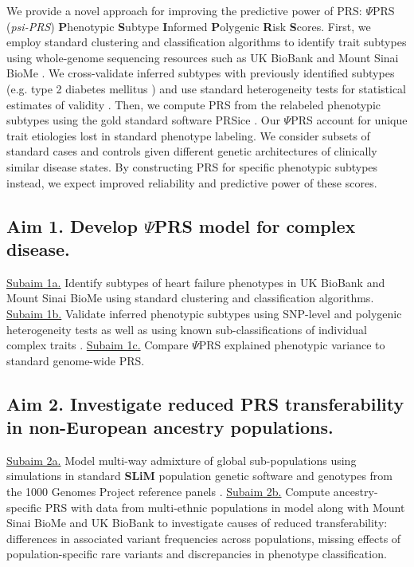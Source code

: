\documentclass[11pt]{article}  %
\newcommand{\inden}[1]{\mbox{} \hspace{#1} } %
\begin{document}
We provide a novel approach for improving the predictive power of PRS: $\Psi$PRS (\textit{psi-PRS}) \textbf{P}henotypic \textbf{S}ubtype \textbf{I}nformed \textbf{P}olygenic \textbf{R}isk \textbf{S}cores. First, we employ standard clustering and classification algorithms to identify trait subtypes using whole-genome sequencing resources such as UK BioBank and Mount Sinai BioMe \cite{bycroft_uk_2018}. We cross-validate inferred subtypes with previously identified subtypes (e.g. type 2 diabetes mellitus \cite{li_identification_2015}) and use standard heterogeneity tests for statistical estimates of validity \cite{dahl_robust_2020}. Then, we compute PRS from the relabeled phenotypic subtypes using the gold standard software PRSice \cite{choi_prsice-2_2019}. Our $\Psi$PRS account for unique trait etiologies lost in standard phenotype labeling. We consider subsets of standard cases and controls given different genetic architectures of clinically similar disease states. By constructing PRS for specific phenotypic subtypes instead, we expect improved reliability and predictive power of these scores.

\subsection*{Aim 1. Develop $\Psi$PRS model for complex disease.}
\underline{Subaim 1a.} Identify subtypes of heart failure phenotypes in UK BioBank and Mount Sinai BioMe using standard clustering and classification algorithms. \underline{Subaim 1b.} Validate inferred phenotypic subtypes using SNP-level \cite{dahl_reverse_2019} and polygenic heterogeneity tests \cite{dahl_robust_2020} as well as using known sub-classifications of individual complex traits \cite{li_identification_2015}. \underline{Subaim 1c.} Compare $\Psi$PRS explained phenotypic variance to standard genome-wide PRS.

\subsection*{Aim 2. Investigate reduced PRS transferability in non-European ancestry populations.}
\underline{Subaim 2a.} Model multi-way admixture of global sub-populations using simulations in standard \textbf{SLiM} population genetic software \cite{haller_slim_2019} and genotypes from the 1000 Genomes Project reference panels \cite{noauthor_global_2015}. \underline{Subaim 2b.} Compute ancestry-specific PRS with data from multi-ethnic populations in model along with Mount Sinai BioMe and UK BioBank to investigate causes of reduced transferability: differences in associated variant frequencies across populations, missing effects of population-specific rare variants and discrepancies in phenotype classification. 
\end{document}
